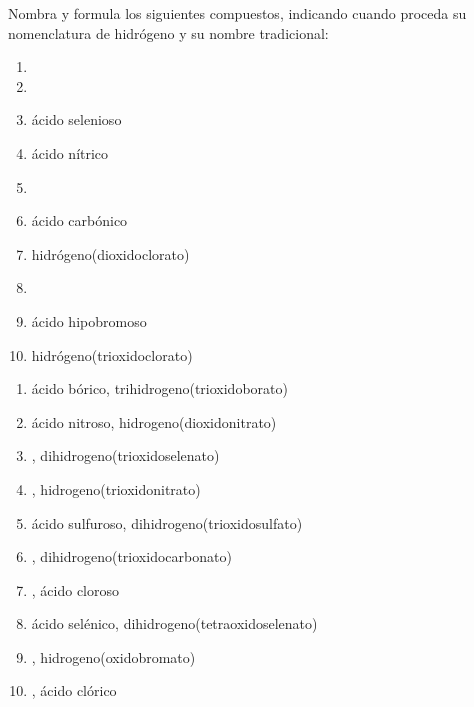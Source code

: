 \begin{exercise}[
    tags    = {inorgánica,ácidos,ácidos binarios,ácidos ternarios,oxoácidos},
    topics  = {química inorgánica,formulación,nomenclatura},
    source  = {SAN Formulación, p28, e36},
  ]
  Nombra y formula los siguientes compuestos, indicando cuando proceda su nomenclatura de hidrógeno y su nombre tradicional:

  \begin{enumerate}
    \item {}
    \item {}
    \item ácido selenioso
    \item ácido nítrico
    \item {}
    \item ácido carbónico
    \item hidrógeno(dioxidoclorato)
    \item {}
    \item ácido hipobromoso
    \item hidrógeno(trioxidoclorato)
  \end{enumerate}
\end{exercise}

\begin{solution}
  \begin{enumerate}
    \item ácido bórico, trihidrogeno(trioxidoborato)
    \item ácido nitroso, hidrogeno(dioxidonitrato)
    \item {}, dihidrogeno(trioxidoselenato)
    \item {}, hidrogeno(trioxidonitrato)
    \item ácido sulfuroso, dihidrogeno(trioxidosulfato)
    \item {}, dihidrogeno(trioxidocarbonato)
    \item {}, ácido cloroso
    \item ácido selénico, dihidrogeno(tetraoxidoselenato)
    \item {}, hidrogeno(oxidobromato)
    \item {}, ácido clórico
  \end{enumerate}
\end{solution}



\newpage




